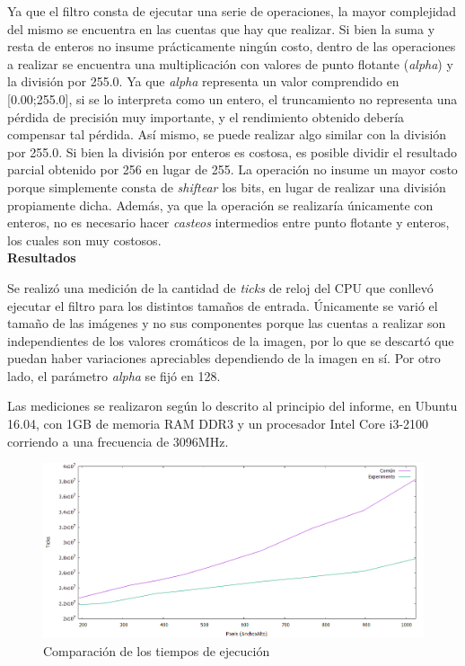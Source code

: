 \documentclass[a4paper]{article}
\begin{document}
Ya que el filtro consta de ejecutar una serie de operaciones, la mayor complejidad del mismo se encuentra en las cuentas que hay que realizar. Si bien la suma y resta de enteros no insume prácticamente ningún costo, dentro de las operaciones a realizar se encuentra una multiplicación con valores de punto flotante (\textit{alpha}) y la división por 255.0. Ya que \textit{alpha} representa un valor comprendido en [0.00;255.0], si se lo interpreta como un entero, el truncamiento no representa una pérdida de precisión muy importante, y el rendimiento obtenido debería compensar tal pérdida. Así mismo, se puede realizar algo similar con la división por 255.0. Si bien la división por enteros es costosa, es posible dividir el resultado parcial obtenido por 256 en lugar de 255. La operación no insume un mayor costo porque simplemente consta de \textit{shiftear} los bits, en lugar de realizar una división propiamente dicha. Además, ya que la operación se realizaría únicamente con enteros, no es necesario hacer \textit{casteos} intermedios entre punto flotante y enteros, los cuales son muy costosos.
\newline
\\
\textbf{Resultados}

Se realizó una medición de la cantidad de \textit{ticks} de reloj del CPU que conllevó ejecutar el filtro para los distintos tamaños de entrada. Únicamente se varió el tamaño de las imágenes y no sus componentes porque las cuentas a realizar son independientes de los valores cromáticos de la imagen, por lo que se descartó que puedan haber variaciones apreciables dependiendo de la imagen en sí. Por otro lado, el parámetro \textit{alpha} se fijó en 128.

Las mediciones se realizaron según lo descrito al principio del informe, en Ubuntu 16.04, con 1GB de memoria RAM DDR3 y un procesador Intel Core i3-2100 corriendo a una frecuencia de 3096MHz.
\\
\begin{figure}[H]
  \begin{center}
	\includegraphics[scale=0.66]{imagenes/combinarExp.png}
	\caption{Comparación de los tiempos de ejecución}
	\label{combinar_exp}
  \end{center}
\end{figure}
\end{document}

